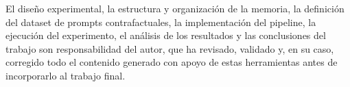 \documentclass[12pt]{report} %
\renewcommand{\_}{\oldunderscore\allowbreak}
\begin{document}
El diseño experimental, la estructura y organización de la memoria, la definición del dataset de prompts contrafactuales, la implementación del pipeline, la ejecución del experimento, el análisis de los resultados y las conclusiones del trabajo son responsabilidad del autor, que ha revisado, validado y, en su caso, corregido todo el contenido generado con apoyo de estas herramientas antes de incorporarlo al trabajo final.
\end{document}
